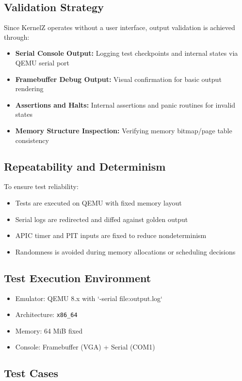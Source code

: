\documentclass[12pt]{extarticle}
\begin{document}
\subsection{Validation Strategy}
Since KernelZ operates without a user interface, output validation is achieved through:
\begin{itemize}
    \item \textbf{Serial Console Output:} Logging test checkpoints and internal states via QEMU serial port
    \item \textbf{Framebuffer Debug Output:} Visual confirmation for basic output rendering
    \item \textbf{Assertions and Halts:} Internal assertions and panic routines for invalid states
    \item \textbf{Memory Structure Inspection:} Verifying memory bitmap/page table consistency
\end{itemize}

\subsection{Repeatability and Determinism}
To ensure test reliability:
\begin{itemize}
    \item Tests are executed on QEMU with fixed memory layout
    \item Serial logs are redirected and diffed against golden output
    \item APIC timer and PIT inputs are fixed to reduce nondeterminism
    \item Randomness is avoided during memory allocations or scheduling decisions
\end{itemize}

\subsection{Test Execution Environment}
\begin{itemize}
    \item Emulator: QEMU 8.x with `-serial file:output.log`
    \item Architecture: \texttt{x86\_64}
    \item Memory: 64 MiB fixed
    \item Console: Framebuffer (VGA) + Serial (COM1)
\end{itemize}
\subsection{Test Cases}
\end{document}
